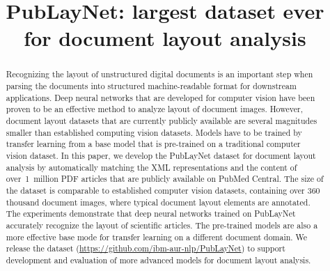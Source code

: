 \documentclass[conference]{IEEEtran}
\begin{document}
\title{PubLayNet: largest dataset ever for document layout analysis}

\author{
\and
{}
\and
{}
}

\maketitle

\begin{abstract}
Recognizing the layout of unstructured digital documents is an important step when parsing the documents into structured machine-readable format for downstream applications. Deep neural networks that are developed for computer vision have been proven to be an effective method to analyze layout of document images. However, document layout datasets that are currently publicly available are several magnitudes smaller than established computing vision datasets. Models have to be trained by transfer learning from a base model that is pre-trained on a traditional computer vision dataset. In this paper, we develop the PubLayNet dataset for document layout analysis by automatically matching the XML representations and the content of over~1~million PDF articles that are publicly available on PubMed Central\textsuperscript{\texttrademark}. The size of the dataset is comparable to established computer vision datasets, containing over 360 thousand document images, where typical document layout elements are annotated. The experiments demonstrate that deep neural networks trained on PubLayNet accurately recognize the layout of scientific articles. The pre-trained models are also a more effective base mode for transfer learning on a different document domain. We release the dataset (\url{https://github.com/ibm-aur-nlp/PubLayNet}) to support development and evaluation of more advanced models for document layout analysis.
\end{abstract}
\end{document}
